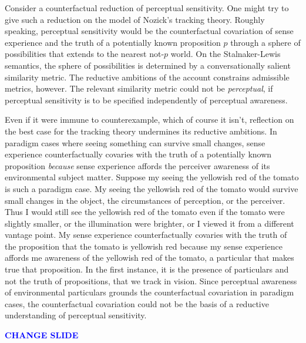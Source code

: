 \documentclass[12pt]{article}
\newcommand{\change}{\textcolor{blue}{\textbf{CHANGE SLIDE}}}
\begin{document}
Consider a counterfactual reduction of perceptual sensitivity. One might try to give such a reduction on the model of Nozick's tracking theory. Roughly speaking, perceptual sensitivity would be the counterfactual covariation of sense experience and the truth of a potentially known proposition \( p \) through a sphere of possibilities that extends to the nearest not-\( p \) world. On the Stalnaker-Lewis semantics, the sphere of possibilities is determined by a conversationally salient similarity metric. The reductive ambitions of the account constrains admissible metrics, however. The relevant similarity metric could not be \emph{perceptual}, if perceptual sensitivity is to be specified independently of perceptual awareness. 

Even if it were immune to counterexample, which of course it isn't, reflection on the best case for the tracking theory undermines its reductive ambitions. In paradigm cases where seeing something can survive small changes, sense experience counterfactually covaries with the truth of a potentially known proposition \emph{because} sense experience affords the perceiver awareness of its environmental subject matter. Suppose my seeing the yellowish red of the tomato is such a paradigm case. My seeing the yellowish red of the tomato would survive small changes in the object, the circumstances of perception, or the perceiver. Thus I would still see the yellowish red of the tomato even if the tomato were slightly smaller, or the illumination were brighter, or I viewed it from a different vantage point. My sense experience counterfactually covaries with the truth of the proposition that the tomato is yellowish red because my sense experience affords me awareness of the yellowish red of the tomato, a particular that makes true that proposition. In the first instance, it is the presence of particulars and not the truth of propositions, that we track in vision. Since perceptual awareness of environmental particulars grounds the counterfactual covariation in paradigm cases, the counterfactual covariation could not be the basis of a reductive understanding of perceptual sensitivity.

\change
\end{document}
